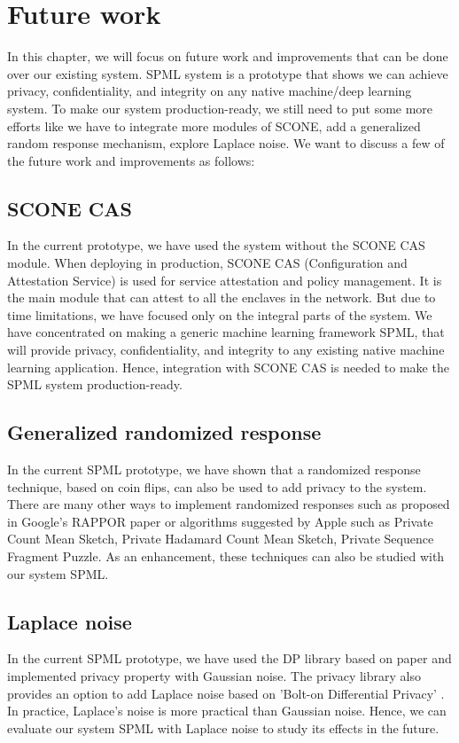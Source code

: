 \chapter{Future work}
\label{sec:fw}
In this chapter, we will focus on future work and improvements that can be done over our existing system. SPML system is a prototype that shows we can achieve privacy, confidentiality, and integrity on any native machine/deep learning system. To make our system production-ready, we still need to put some more efforts like we have to integrate more modules of SCONE, add a generalized random response mechanism, explore Laplace noise. We want to discuss a few of the future work and improvements as follows:

\section{SCONE CAS}
In the current prototype, we have used the system without the SCONE CAS \cite{78}  module. When deploying in production, SCONE CAS (Configuration and Attestation Service) is used for service attestation and policy management. It is the main module that can attest to all the enclaves in the network. But due to time limitations, we have focused only on the integral parts of the system. We have concentrated on making a generic machine learning framework SPML, that will provide privacy, confidentiality, and integrity to any existing native machine learning application. Hence, integration with SCONE CAS is needed to make the SPML system production-ready.

\section{Generalized randomized response}
In the current SPML prototype, we have shown that a randomized response technique, based on coin flips, can also be used to add privacy to the system. There are many other ways to implement randomized responses such as proposed in Google's RAPPOR paper \cite{5} or algorithms suggested by Apple \cite{75} such as Private Count Mean Sketch, Private Hadamard Count Mean Sketch, Private Sequence Fragment Puzzle. As an enhancement, these techniques can also be studied with our system SPML.

\section{Laplace noise}
In the current SPML prototype, we have used the DP library based on paper \cite{4} and implemented privacy property with Gaussian noise. The privacy library also provides an option to add Laplace noise based on 'Bolt-on Differential Privacy' \cite{79}. In practice, Laplace's noise is more practical than Gaussian noise. Hence, we can evaluate our system SPML with Laplace noise to study its effects in the future.


